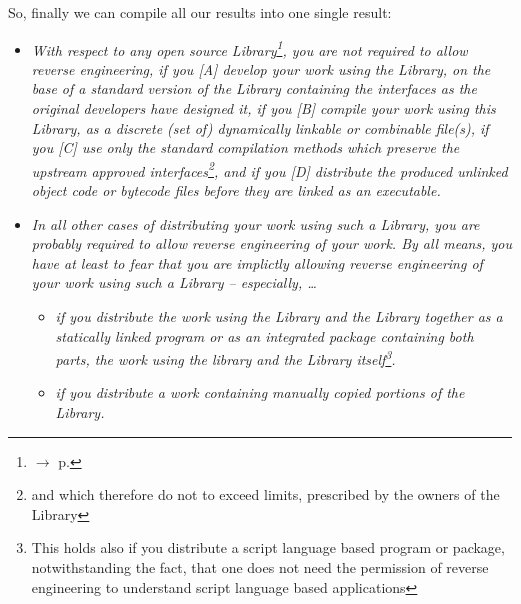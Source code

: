 %
%
%
%
%

So, finally we can compile all our results into one single result:

\begin{itemize}
  \item \emph{With respect to any open source Library\footnote{$\rightarrow$ p.
  \pageref{RevEngOslicOsLisences}}, you are not required to allow reverse
  engineering, if you [A] develop your work using the Library, on the base of a
  standard version of the Library containing the interfaces as the original
  developers have designed it, if you [B] compile your work using this Library,
  as a discrete (set of) dynamically linkable or combinable file(s), if you [C]
  use only the standard compilation methods which preserve the upstream approved
  interfaces\footnote{and which therefore do not to exceed limits, prescribed by
  the owners of the Library}, and if you [D] distribute the produced unlinked
  object code or bytecode files before they are linked as an executable.}
  \item \emph{In all other cases of distributing your work using such a Library,
  you are probably required to allow reverse engineering of your work. By all
  means, you have at least to fear that you are implictly allowing reverse
  engineering of your work using such a Library -- especially, \ldots}
  \begin{itemize}
    \item \emph{if you distribute the work using the Library and the Library
    together as a statically linked program or as an integrated package
    containing both parts, the work using the library and the Library
    itself\footnote{This holds also if you distribute a script language based
    program or package, notwithstanding the fact, that one does not need the
    permission of reverse engineering to understand script language based
    applications}.}
    \item \emph{if you distribute a work containing manually copied portions of
    the Library.}
  \end{itemize}
\end{itemize}
 
